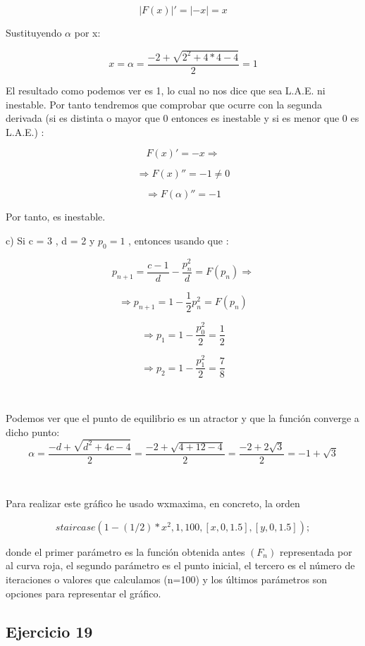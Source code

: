 \documentclass[11pt, a4paper]{article}
\newif\IfInSansMode
\numberwithin{equation}{section}
\theoremstyle{theorem-style}
\theoremstyle{definition-style}
\theoremstyle{remark-style}
\theoremstyle{example-style}
\begin{document}
    \[
        |F(x)|' = |-x| = x 
    \]

    Sustituyendo $\alpha$ por x:

    \[
        x = \alpha = \frac{-2+\sqrt{2^{2} +4*4-4}}{2} = 1
    \]

    El resultado como podemos ver es 1, lo cual no nos dice que sea L.A.E. ni inestable. Por tanto tendremos que comprobar que ocurre con la segunda derivada (si es distinta o mayor que 0 entonces es inestable y si es menor que 0 es L.A.E.) :

    \[
        F(x)' = -x \Rightarrow
    \]

    \[
        \Rightarrow F(x)'' = -1 \neq 0
    \]

    \[
        \Rightarrow F(\alpha)'' = -1
    \]

    Por tanto, es inestable.

    c) Si c = 3 , d = 2 y $p_0 = 1$ , entonces usando que : 

    \[
        p_{n+1} = \frac{c-1}{d} - \frac{p_{n}^{2}}{d} = F(p_n) \Rightarrow
    \]

    \[
        \Rightarrow p_{n+1} = 1 - \frac{1}{2}p_n^{2} = F(p_n)
    \]

    \[
        \Rightarrow p_1 = 1 - \frac{p_0^{2}}{2} = \frac{1}{2}
    \]

    \[
        \Rightarrow p_2 = 1 - \frac{p_1^{2}}{2} = \frac{7}{8}
    \]

    \

    Podemos ver que el punto de equilibrio es un atractor y que la funci\'on converge a dicho punto:
    \[
        \alpha = \frac{-d+\sqrt{d^{2} +4c-4}}{2} = \frac{-2+\sqrt{4 +12-4}}{2} = \frac{-2+2\sqrt{3}}{2} = -1+\sqrt{3}  
    \]

    \

    Para realizar este gr\'afico he usado wxmaxima, en concreto, la orden 

    \[
        staircase(1-(1/2)*x^2,1,100,[x,0,1.5],[y,0,1.5]);
    \]

    donde el primer parámetro es la función obtenida antes $(F_n)$ representada por al curva roja, el segundo parámetro es el punto inicial, el tercero es el número de iteraciones o valores que calculamos (n=100) y los últimos parámetros son opciones para representar el gráfico.

    \subsection{Ejercicio 19}
\end{document}
